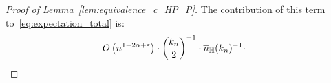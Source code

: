 \begin{proof}[Proof of Lemma~\ref{lem:equivalence_c_HP_P}]
%
The contribution 
of this term to~\eqref{eq:expectation_total} is:
\begin{equation*} 
\begin{split}
& O\left( n^{1-2\alpha + \eps} \right) \cdot {k_n \choose 2}^{-1} \cdot \expH^{-1} \cdot 

\end{split}
\end{equation*}
\end{proof}
